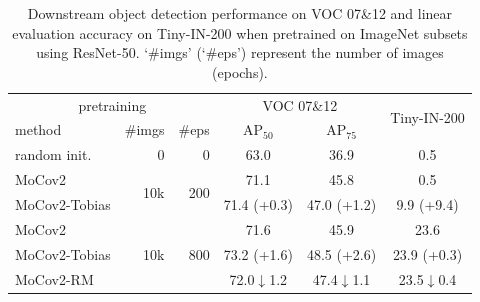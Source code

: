 \documentclass[letterpaper]{article} %
\def\pt{\phantom{0}}
\begin{document}
\begin{table}
	\caption{Downstream object detection performance on VOC 07\&12 and linear evaluation accuracy on Tiny-IN-200 when pretrained on ImageNet subsets using ResNet-50. `\#imgs' (`\#eps') represent the number of images (epochs).}
	\label{tab:small-imagenet-result}
	\centering
	\small
	\setlength{\tabcolsep}{1.2pt}
	\renewcommand{\arraystretch}{0.95}
	\renewcommand{\multirowsetup}{\centering}
	\begin{tabular}{l|r|r|c|c|c}
		\hline
		\multicolumn{3}{c|}{pretraining}          &           \multicolumn{2}{c|}{VOC 07\&12}    &\multirow{2}{*}{Tiny-IN-200}         \\ 
		\cline{1-5}
		method & \#imgs&\#eps & $\text{AP}_{50}$ & $\text{AP}_{75}$ &\\
		\hline
		random init.                           &0&   0&     63.0 \pt\pt\pt\pt\pt         &       36.9 \pt\pt\pt\pt\pt        & \pt0.5 \pt\pt\pt\pt\pt \\
		\hline
		MoCov2	&\multirow{2}{*}{10k} &   \multirow{2}{*}{200}  &     71.1 \pt\pt\pt\pt\pt    &  45.8 \pt\pt\pt\pt\pt     &  \pt0.5 \pt\pt\pt\pt\pt   \\
		MoCov2-Tobias&&     &          71.4 (\textcolor{grassgreen}{+0.3})    &    47.0  (\textcolor{grassgreen}{+1.2})           & \pt9.9 (\textcolor{grassgreen}{+9.4})  \\
		\cline{1-6}
		MoCov2	&\multirow{3}{*}{10k} &   \multirow{3}{*}{800}  &     71.6 \pt\pt\pt\pt\pt     &  45.9 \pt\pt\pt\pt\pt     &  23.6 \pt\pt\pt\pt\pt   \\
		MoCov2-Tobias&&     &          73.2 (\textcolor{grassgreen}{+1.6})  &    48.5  (\textcolor{grassgreen}{+2.6})           & 23.9 (\textcolor{grassgreen}{+0.3})  \\
		MoCov2-RM&&     &          72.0\pt$\downarrow$1.2\pt     &    47.4\pt$\downarrow$1.1\pt           &  23.5\pt$\downarrow$0.4\pt   \\

\end{tabular}
\end{table}
\end{document}
